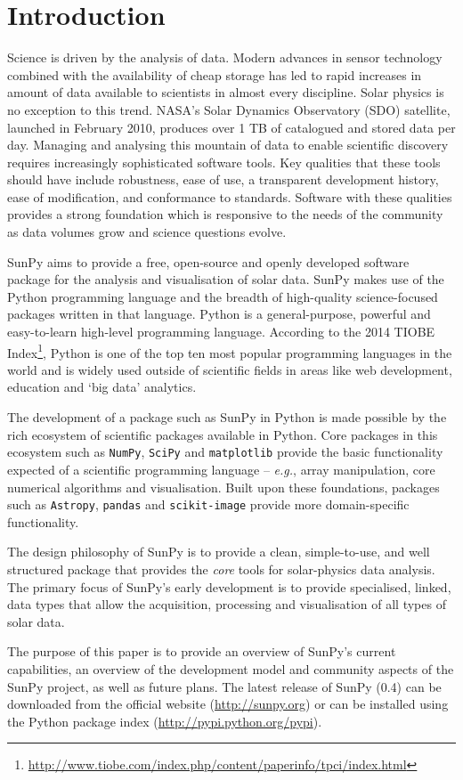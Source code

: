 \section{Introduction}\label{sec:Intro}

Science is driven by the analysis of data. Modern advances in sensor
technology combined with the availability of cheap storage has led to
rapid increases in amount of data available to scientists in almost
every discipline.  Solar physics is no exception to this trend. NASA's
Solar Dynamics Observatory (SDO) satellite, launched in February 2010,
produces over 1 TB of catalogued and stored data per day. Managing and
analysing this mountain of data to enable scientific discovery
requires increasingly sophisticated software tools.  Key qualities
that these tools should have include robustness, ease of use, a
transparent development history, ease of modification, and conformance
to standards.  Software with these qualities provides a strong
foundation which is responsive to the needs of the community as data
volumes grow and science questions evolve.

SunPy aims to provide a free, open-source and openly developed software package 
for the analysis and visualisation of solar data. SunPy makes use of the Python 
programming language and the breadth of high-quality science-focused packages 
written in that language. Python is a general-purpose, 
powerful and easy-to-learn high-level programming language.
According to the 
2014 TIOBE Index\footnote{\url{http://www.tiobe.com/index.php/content/paperinfo/tpci/index.html}},
 Python is one of the top ten most popular programming languages in the world 
and is widely used outside of scientific fields in areas like web development, education 
and `big data' analytics.

The development of a package such as SunPy in Python is made possible by the 
rich ecosystem of scientific packages available in Python. Core packages in this 
ecosystem such as \texttt{NumPy}, \texttt{SciPy} and \texttt{matplotlib} 
provide the basic functionality expected of a scientific programming language -- 
\textit{e.g.}, array manipulation, core numerical algorithms and visualisation. 
Built upon these foundations, packages such as \texttt{Astropy}, \texttt{pandas} and 
\texttt{scikit-image} provide more domain-specific functionality.

The design philosophy of SunPy is to provide a clean, simple-to-use, and well 
structured package that provides the \textit{core} tools for solar-physics data analysis. The 
primary focus of SunPy's early development is to provide specialised, linked, 
data types that allow the acquisition, processing and visualisation of all types 
of solar data.

The purpose of this paper is to provide an overview of SunPy's current 
capabilities, an overview of the development model and community aspects of the 
SunPy project, as well as future plans. The latest release of SunPy (0.4)
can be downloaded from
the official website (\url{http://sunpy.org}) or can be installed using 
the Python package index (\mbox{\url{http://pypi.python.org/pypi}}).
